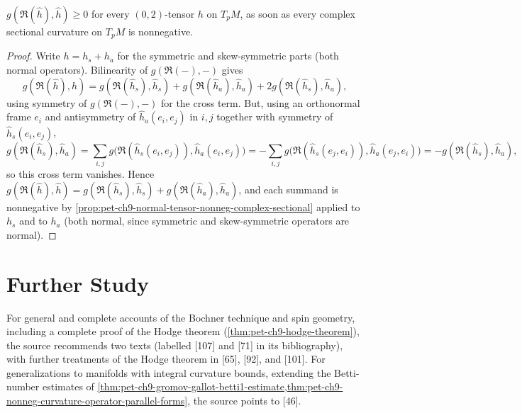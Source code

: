 \begin{proposition}[Proposition 9.4.13]
  \label{prop:pet-ch9-general-tensor-nonneg-complex-sectional}
  $g(\mathfrak{R}(\hat h),\hat h)\ge0$ for every $(0,2)$-tensor $h$ on $T_pM$, as
  soon as every complex sectional curvature on $T_pM$ is nonnegative.
\end{proposition}
\begin{proof}
  Write $h=h_s+h_a$ for the symmetric and skew-symmetric parts (both normal
  operators). Bilinearity of $g(\mathfrak{R}(-),-)$ gives
  \[
    g(\mathfrak{R}(\hat h),\hat h)=g(\mathfrak{R}(\hat h_s),\hat h_s)
    +g(\mathfrak{R}(\hat h_a),\hat h_a)+2g(\mathfrak{R}(\hat h_s),\hat h_a),
  \]
  using symmetry of $g(\mathfrak{R}(-),-)$ for the cross term. But, using an
  orthonormal frame $e_i$ and antisymmetry of $\hat h_a(e_i,e_j)$ in $i,j$
  together with symmetry of $\hat h_s(e_i,e_j)$,
  \[
    g(\mathfrak{R}(\hat h_s),\hat h_a)=\sum_{i,j}g\big(\mathfrak{R}(\hat h_s(e_i,e_j)),\hat h_a(e_i,e_j)\big)
    =-\sum_{i,j}g\big(\mathfrak{R}(\hat h_s(e_j,e_i)),\hat h_a(e_j,e_i)\big)
    =-g(\mathfrak{R}(\hat h_s),\hat h_a),
  \]
  so this cross term vanishes. Hence
  $g(\mathfrak{R}(\hat h),\hat h)=g(\mathfrak{R}(\hat h_s),\hat h_s)+g(\mathfrak{R}(\hat h_a),\hat h_a)$,
  and each summand is nonnegative by
  \cref{prop:pet-ch9-normal-tensor-nonneg-complex-sectional} applied to $h_s$
  and to $h_a$ (both normal, since symmetric and skew-symmetric operators are
  normal).
\end{proof}

\section{Further Study}

For general and complete accounts of the Bochner technique and spin geometry,
including a complete proof of the Hodge theorem
(\cref{thm:pet-ch9-hodge-theorem}), the source recommends two texts (labelled
[107] and [71] in its bibliography), with further treatments of the Hodge
theorem in [65], [92], and [101]. For generalizations to manifolds with
integral curvature bounds, extending the Betti-number estimates of
\cref{thm:pet-ch9-gromov-gallot-betti1-estimate,thm:pet-ch9-nonneg-curvature-operator-parallel-forms},
the source points to [46].

